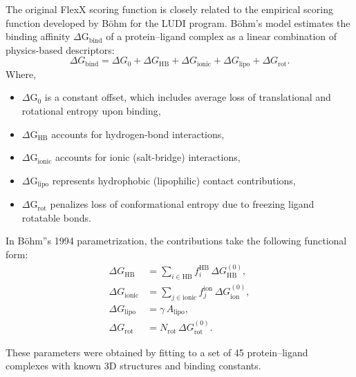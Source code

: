 \documentclass[12pt, a4paper]{article}
\begin{document}
The original FlexX scoring function is closely related to the empirical scoring function developed by B{\"o}hm for the LUDI program.\cite{CH7_bohm1994} B{\"o}hm's model estimates the binding affinity $\Delta \text{G}_{\text{bind}}$ of a protein--ligand complex as a linear combination of physics-based descriptors:
\begin{equation}
  \Delta G_{\text{bind}}
   =
  \Delta G_0
  +
  \Delta G_{\text{HB}}
  +
  \Delta G_{\text{ionic}}
  +
  \Delta G_{\text{lipo}}
  +
  \Delta G_{\text{rot}}.
  \label{eq:boehm_general}
\end{equation}
Where,
\begin{itemize}
  \item $\Delta \text{G}_0$ is a constant offset, which includes average loss of translational and rotational entropy upon binding,
  \item $\Delta \text{G}_{\text{HB}}$ accounts for hydrogen-bond interactions,
  \item $\Delta \text{G}_{\text{ionic}}$ accounts for ionic (salt-bridge) interactions,
  \item $\Delta \text{G}_{\text{lipo}}$ represents hydrophobic (lipophilic) contact contributions,
  \item $\Delta \text{G}_{\text{rot}}$ penalizes loss of conformational entropy due to freezing ligand rotatable bonds.
\end{itemize}

In B{\"o}hm''s 1994 parametrization, the contributions take the following functional form:
\begin{align}
  \Delta G_{\text{HB}}
  &=
  \sum_{i \in \text{HB}}
  f_i^{\text{HB}} \,
  \Delta G_{\text{HB}}^{(0)},
  \label{eq:boehm_hb}
  \\
  \Delta G_{\text{ionic}}
  &=
  \sum_{j \in \text{ionic}}
  f_j^{\text{ion}} \,
  \Delta G_{\text{ion}}^{(0)},
  \label{eq:boehm_ionic}
  \\
  \Delta G_{\text{lipo}}
  &=
  \gamma \,
  A_{\text{lipo}},
  \label{eq:boehm_lipo}
  \\
  \Delta G_{\text{rot}}
  &=
  N_{\text{rot}} \,
  \Delta G_{\text{rot}}^{(0)}.
  \label{eq:boehm_rot}
\end{align}

These parameters were obtained by fitting to a set of 45 protein--ligand complexes with known 3D structures and binding constants.\cite{CH7_bohm1994} 
\end{document}
